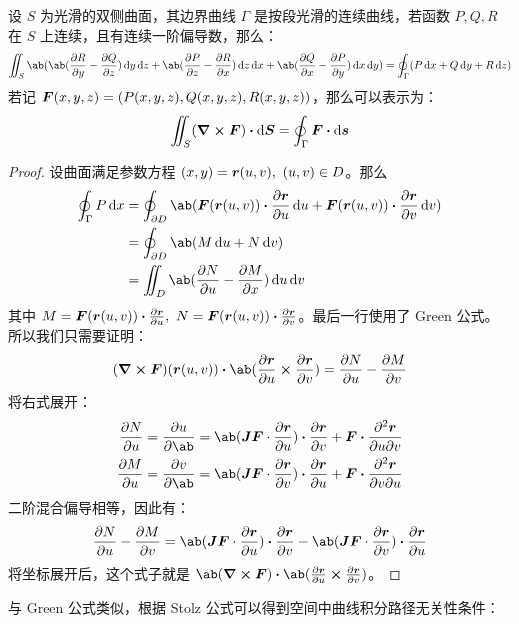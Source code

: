 \begin{theorem}[Stokes 公式]
	设 $S$ 为光滑的双侧曲面，其边界曲线 $\Gamma$ 是按段光滑的连续曲线，若函数 $P, Q, R$ 在 $S$ 上连续，且有连续一阶偏导数，那么：
	$$
	\iint_S \ab(\ab(\pdv{R}{y} - \pdv{Q}{z}) \dd{y} \dd{z} + \ab(\pdv{P}{z} - \pdv{R}{x}) \dd{z} \dd{x} + \ab(\pdv{Q}{x} - \pdv{P}{y}) \dd{x} \dd{y}) = \oint_{\Gamma} (P \dd{x} + Q \dd{y} + R \dd{z})
	$$
	若记 $\boldsymbol{F}(x, y, z) = (P(x, y, z), Q(x, y, z), R(x, y, z))$，那么可以表示为：
	$$
	\iint_S (\curl \vect{F}) \vdot \dd{\vect{S}} = \oint_{\Gamma} \vect{F} \vdot \dd{\vect{s}}
	$$
	\begin{proof}
		设曲面满足参数方程 $(x, y) = \boldsymbol{r}(u, v),\ (u, v) \in D$。那么
		$$
		\begin{aligned}
			\oint_{\Gamma} P \dd{x} & = \oint_{\partial D} \ab(\vect{F}(\vect{r}(u, v)) \vdot \pdv{\vect{r}}{u} \dd{u} + \vect{F}(\vect{r}(u, v)) \vdot \pdv{\vect{r}}{v} \dd{v}) \\
			& = \oint_{\partial D} \ab(M \dd{u} + N \dd{v}) \\
			& = \iint_{D} \ab(\pdv{N}{u} - \pdv{M}{x}) \dd{u} \dd{v}
		\end{aligned}
		$$
		其中 $M = \vect{F}(\vect{r}(u, v)) \vdot \pdv{\vect{r}}{u},\ N = \vect{F}(\vect{r}(u, v)) \vdot \pdv{\vect{r}}{v}$。最后一行使用了 Green 公式。所以我们只需要证明：
		$$
		(\curl \vect{F})(\vect{r}(u, v)) \vdot \ab(\pdv{\vect{r}}{u} \cp \pdv{\vect{r}}{v}) = \pdv{N}{u} - \pdv{M}{v} 
		$$
		将右式展开：
		$$
		\begin{aligned}
			\pdv{N}{u} & = \pdv{u} \ab(\vect{F}(\vect{r}) \vdot \pdv{\vect{r}}{v})  = \ab(\vect{J} \vect{F} \cdot \pdv{\vect{r}}{u}) \vdot \pdv{\vect{r}}{v} + \vect{F} \vdot \pdv[2]{\vect{r}}{u}{v} \\
			\pdv{M}{u} & = \pdv{v} \ab(\vect{F}(\vect{r}) \vdot \pdv{\vect{r}}{u})  = \ab(\vect{J} \vect{F} \cdot \pdv{\vect{r}}{v}) \vdot \pdv{\vect{r}}{u} + \vect{F} \vdot \pdv[2]{\vect{r}}{v}{u} \\
		\end{aligned}
		$$
		二阶混合偏导相等，因此有：
		$$
		\pdv{N}{u} - \pdv{M}{v} = \ab(\vect{J} \vect{F} \cdot \pdv{\vect{r}}{u}) \vdot \pdv{\vect{r}}{v} - \ab(\vect{J} \vect{F} \cdot \pdv{\vect{r}}{v}) \vdot \pdv{\vect{r}}{u}
		$$
		将坐标展开后，这个式子就是 $\ab(\curl \vect{F}) \vdot \ab(\pdv{\vect{r}}{u} \cp \pdv{\vect{r}}{v})$。
	\end{proof}
\end{theorem}

与 Green 公式类似，根据 Stolz 公式可以得到空间中曲线积分路径无关性条件：

